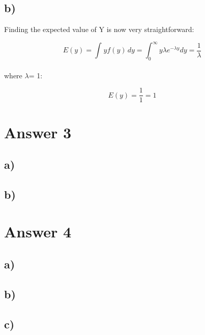 \documentclass[12pt]{article}
\begin{document}
\subsection*{b)} 

Finding the expected value of Y is now very straightforward:

\[ E(y) =  \int_{ }^{ } yf(y)\, dy = \int_{0}^{\infty } y\lambda e^{-\lambda y} dy = \frac{1}{\lambda}\] \\

where \( \lambda \)= 1:

\[ E(y) = \frac{1}{1} = 1 \]


\section*{Answer 3}
\subsection*{a)} 

\subsection*{b)} 


\section*{Answer 4}
\subsection*{a)} 

\subsection*{b)} 

\subsection*{c)} 
\end{document}
